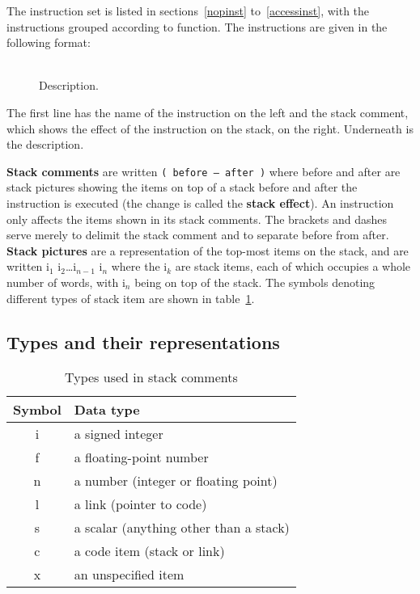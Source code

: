 \documentclass[english]{scrartcl}
\newcommand{\spic}[1]{{\spfont\setlength{\baselineskip}{\normalbaselineskip}#1\/}}
\newlength{\itemwidth}\itemwidth=\textwidth \advance\itemwidth by -0.25in
\newlength{\instname}\instname=0.5in
\newlength{\stackcom}\stackcom=\itemwidth \advance\stackcom by -\instname
\newcommand{\inst}[3]{\item[]\parbox{\itemwidth}%
{\makebox[\instname][l]{\tt #1}%
\makebox[\stackcom][r]{\tt ( \spic{#2} )}\\[0.5ex]#3}}
\begin{document}
The instruction set is listed in sections~\ref{nopinst} to~\ref{accessinst}, with the instructions grouped according to function. The instructions are given in the following format:

\begin{description}
\inst{NAME}{before -- after}{Description.}
\end{description}

The first line has the name of the instruction on the left and the stack comment, which shows the effect of the instruction on the stack, on the right. Underneath is the description.

\textbf{Stack comments} are written {\tt ( \spic{before -- after} )} where \spic{before} and \spic{after} are stack pictures showing the items on top of a stack before and after the instruction is executed (the change is called the \textbf{stack effect}). An instruction only affects the items shown in its stack comments. The brackets and dashes serve merely to delimit the stack comment and to separate \spic{before} from \spic{after}. \textbf{Stack pictures} are a representation of the top-most items on the stack, and are written \spic{i$_1$ i$_2$\dots i$_{n-1}$ i$_n$} where the \spic{i$_k$} are stack items, each of which occupies a whole number of words, with \spic{i$_n$} being on top of the stack. The symbols denoting different types of stack item are shown in table~\ref{typetable}.


\subsection{Types and their representations}

\begin{table}[htbp]
  \begin{center}
    \begin{tabular}{cl} \toprule
      \textbf{Symbol} & \textbf{Data type} \\ \midrule
      \spic{i} & a signed integer \\
      \spic{f} & a floating-point number \\
      \spic{n} & a number (integer or floating point) \\
      \spic{l} & a link (pointer to code) \\
      \spic{s} & a scalar (anything other than a stack) \\
      \spic{c} & a code item (stack or link) \\
      \spic{x} & an unspecified item \\
      \bottomrule
    \end{tabular}
    \caption{\label{typetable}Types used in stack comments}
  \end{center}
\end{table}
\end{document}
